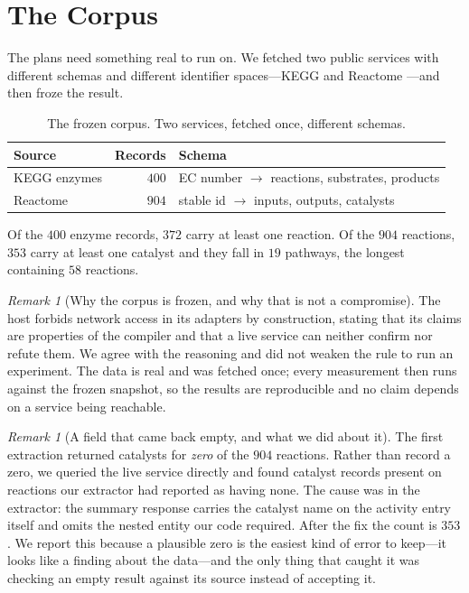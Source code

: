\documentclass[11pt,twocolumn,a4paper]{article}
\theoremstyle{plain}
\theoremstyle{definition}
\theoremstyle{remark}
\newtheorem{remark}[theorem]{Remark}
\begin{document}
\section{The Corpus}
\label{sec:corpus}

The plans need something real to run on. We fetched two public services with
different schemas and different identifier spaces---KEGG
\citep{kanehisa2000kegg} and Reactome \citep{milacic2024reactome}---and then
froze the result.

\begin{table}[!htbp]
\centering
\caption{The frozen corpus. Two services, fetched once, different schemas.}
\label{tab:corpus}
\begin{tabular}{lrl}
\toprule
Source & Records & Schema \\
\midrule
KEGG enzymes    & $400$ & EC number $\to$ reactions, substrates, products \\
Reactome        & $904$ & stable id $\to$ inputs, outputs, catalysts \\
\bottomrule
\end{tabular}
\end{table}

Of the $400$ enzyme records, $372$ carry at least one reaction. Of the $904$
reactions, $353$ carry at least one catalyst and they fall in $19$ pathways,
the longest containing $58$ reactions.

\begin{remark}[Why the corpus is frozen, and why that is not a compromise]
\label{rem:frozen}
The host forbids network access in its adapters by construction, stating that
its claims are properties of the compiler and that a live service can neither
confirm nor refute them. We agree with the reasoning and did not weaken the
rule to run an experiment. The data is real and was fetched once; every
measurement then runs against the frozen snapshot, so the results are
reproducible and no claim depends on a service being reachable.
\end{remark}

\begin{remark}[A field that came back empty, and what we did about it]
\label{rem:emptyfield}
The first extraction returned catalysts for \emph{zero} of the $904$
reactions. Rather than record a zero, we queried the live service directly and
found catalyst records present on reactions our extractor had reported as
having none. The cause was in the extractor: the summary response carries the
catalyst name on the activity entry itself and omits the nested entity our
code required. After the fix the count is $353$. We report this because a
plausible zero is the easiest kind of error to keep---it looks like a finding
about the data---and the only thing that caught it was checking an empty result
against its source instead of accepting it.
\end{remark}
\end{document}
